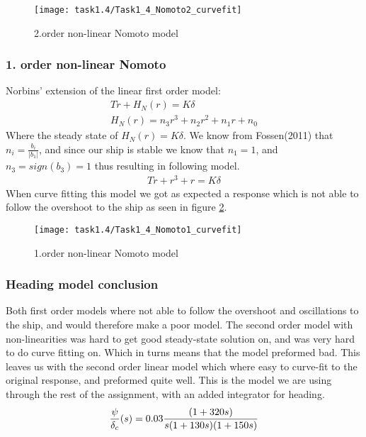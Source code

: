 \begin{figure}[H]
    \centering
    \texttt{[image: task1.4/Task1\_4\_Nomoto2\_curvefit]}
    \caption{2.order non-linear Nomoto model}
    \label{fig:nomoto2_nonlin}
\end{figure}

\subsubsection*{1. order non-linear Nomoto}
Norbins' extension of the linear first order model:
\begin{equation}
\begin{split}
	T\dot{r}+H_N(r)=K\delta \\
	H_N(r) = n_3r^3 + n_2r^2 + n_1r + n_0
\end{split}
\end{equation}
Where the steady state of $H_N(r)=K\delta$. We know from Fossen(2011) that $n_i = \frac{b_i}{|b_1|}$, and since our ship is stable we know that $n_1=1$, and $n_3 = sign(b_3)=1$ thus resulting in following model.
\begin{equation}
\begin{split}
	T\dot{r}+r^3 + r=K\delta 
\end{split}
\end{equation}
When curve fitting this model we got as expected a response which is not able to follow the overshoot to the ship as seen in figure \ref{fig:nomoto1_nonlin}.

\begin{figure}[H]
    \centering
    \texttt{[image: task1.4/Task1\_4\_Nomoto1\_curvefit]}
    \caption{1.order non-linear Nomoto model}
    \label{fig:nomoto1_nonlin}
\end{figure}

\subsubsection*{Heading model conclusion}
Both first order models where not able to follow the overshoot and oscillations to the ship, and would therefore make a poor model. The second order model with non-linearities was hard to get good steady-state solution on, and was very hard to do curve fitting on. Which in turns means that the model preformed bad. This leaves us with the second order linear model which where easy to curve-fit to the original response, and preformed quite well. This is the model we are using through the rest of the assignment, with an added integrator for heading. 
\begin{equation}
    \frac{\psi}{\delta_c}(s) =0.03 \frac{(1+320 s)}{s(1+130 s) (1+150 s) } \\
\end{equation}


